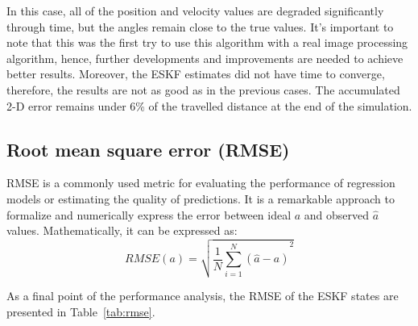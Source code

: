 In this case, all of the position and velocity values are degraded significantly through time, but the angles remain close to the true values. It's important to note that this was the first try to use this algorithm with a real image processing algorithm, hence, further developments and improvements are needed to achieve better results. Moreover, the ESKF estimates did not have time to converge, therefore, the results are not as good as in the previous cases. The accumulated 2-D error remains under 6\% of the travelled distance at the end of the simulation.

\subsection{Root mean square error (RMSE)} 

RMSE is a commonly used metric for evaluating the performance of regression models or estimating the quality of predictions. It is a remarkable approach to formalize and numerically express the error between ideal $a$ and observed $\hat{a}$ values. Mathematically, it can be expressed as:
\begin{equation}
    RMSE(a)=\sqrt{\frac{1}{N}{\sum_{i=1}^N(\hat{a}-a)}^2}
\end{equation}

As a final point of the performance analysis, the RMSE of the ESKF states are presented in Table~\ref{tab:rmse}.


